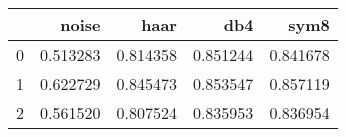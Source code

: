 \begin{tabular}{lrrrr}
\toprule
{} &     noise &      haar &       db4 &      sym8 \\
\midrule
0 &  0.513283 &  0.814358 &  0.851244 &  0.841678 \\
1 &  0.622729 &  0.845473 &  0.853547 &  0.857119 \\
2 &  0.561520 &  0.807524 &  0.835953 &  0.836954 \\
\bottomrule
\end{tabular}

